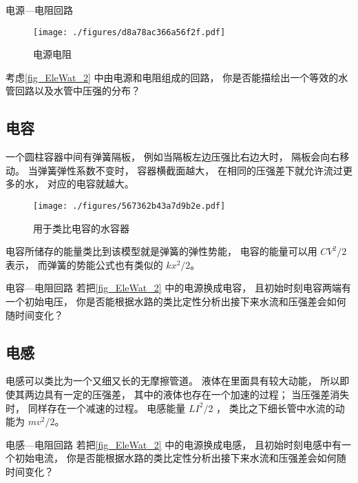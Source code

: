 \begin{exercise}{电源—电阻回路}
\begin{figure}[ht]
\centering
\texttt{[image: ./figures/d8a78ac366a56f2f.pdf]}
\caption{电源电阻} \label{fig_EleWat_2}
\end{figure}
考虑\autoref{fig_EleWat_2} 中由电源和电阻组成的回路， 你是否能描绘出一个等效的水管回路以及水管中压强的分布？
\end{exercise}

\subsection{电容}
一个圆柱容器中间有弹簧隔板， 例如当隔板左边压强比右边大时， 隔板会向右移动。 当弹簧弹性系数不变时， 容器横截面越大， 在相同的压强差下就允许流过更多的水， 对应的电容就越大。
\begin{figure}[ht]
\centering
\texttt{[image: ./figures/567362b43a7d9b2e.pdf]}
\caption{用于类比电容的水容器} \label{fig_EleWat_1}
\end{figure}

电容所储存的能量类比到该模型就是弹簧的弹性势能， 电容的能量可以用 $CV^2/2$ 表示， 而弹簧的势能公式也有类似的 $kx^2/2$。

\begin{exercise}{电容—电阻回路}\label{exe_EleWat_1}
若把\autoref{fig_EleWat_2} 中的电源换成电容， 且初始时刻电容两端有一个初始电压， 你是否能根据水路的类比定性分析出接下来水流和压强差会如何随时间变化？
\end{exercise}

\subsection{电感}
电感可以类比为一个又细又长的无摩擦管道。 液体在里面具有较大动能， 所以即使其两边具有一定的压强差， 其中的液体也存在一个加速的过程； 当压强差消失时， 同样存在一个减速的过程。 电感能量 $LI^2/2$ ， 类比之下细长管中水流的动能为 $mv^2/2$。


\begin{exercise}{电感—电阻回路}
若把\autoref{fig_EleWat_2} 中的电源换成电感， 且初始时刻电感中有一个初始电流， 你是否能根据水路的类比定性分析出接下来水流和压强差会如何随时间变化？
\end{exercise}
